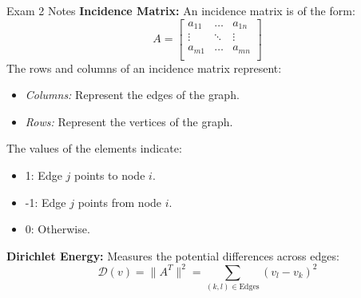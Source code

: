 \begin{examnotes}{Exam 2 Notes}
    \textbf{Incidence Matrix:} An incidence matrix is of the form:
    \begin{equation*}
        A = 
        \begin{bmatrix}
            a_{11} & \dots & a_{1n} \\
            \vdots & \ddots & \vdots \\
            a_{m1} & \dots & a_{mn} \\
        \end{bmatrix}
    \end{equation*}
    The rows and columns of an incidence matrix represent:
    \begin{itemize}
        \item \textit{Columns:} Represent the edges of the graph.
        \item \textit{Rows:} Represent the vertices of the graph.
    \end{itemize}
    The values of the elements indicate:
    \begin{itemize}
        \item 1: Edge $j$ points to node $i$.
        \item -1: Edge $j$ points from node $i$.
        \item 0: Otherwise.
    \end{itemize}

    \textbf{Dirichlet Energy:} Measures the potential differences across edges:
    \begin{equation*}
        \mathcal{D}(v) = \|A^{T}\|^{2} = \sum_{(k,l) \in \text{Edges}} (v_{l} - v_{k})^{2}
    \end{equation*}


\end{examnotes}

